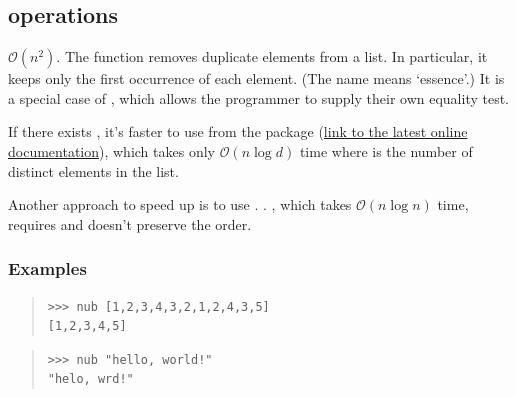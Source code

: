 \subsection{ operations}
\begin{haddockdesc}
\item[\begin{tabular}{@{}l}
nub :: Eq a => {\char 91}a{\char 93} -> {\char 91}a{\char 93}
\end{tabular}]
{\haddockbegindoc
\(\mathcal{O}(n^2)\). The  function removes duplicate elements from a
 list. In particular, it keeps only the first occurrence of each element. (The
 name  means `essence'.) It is a special case of , which allows
 the programmer to supply their own equality test.\par
If there exists , it's faster to use  from the  package
 (\href{https://hackage.haskell.org/package/containers/docs/Data-Containers-ListUtils.html#v:nubOrd}{link to the latest online documentation}),
 which takes only \(\mathcal{O}(n \log d)\) time where  is the number of
 distinct elements in the list.\par
Another approach to speed up  is to use
   .  . ,
 which takes \(\mathcal{O}(n \log n)\) time, requires  and doesn't
 preserve the order.\par
\subsubsection*{\textbf{Examples}}
\begin{quote}
{\haddockverb\begin{verbatim}
>>> nub [1,2,3,4,3,2,1,2,4,3,5]
[1,2,3,4,5]

\end{verbatim}}
\end{quote}
\begin{quote}
{\haddockverb\begin{verbatim}
>>> nub "hello, world!"
"helo, wrd!"

\end{verbatim}}
\end{quote}}
\end{haddockdesc}

